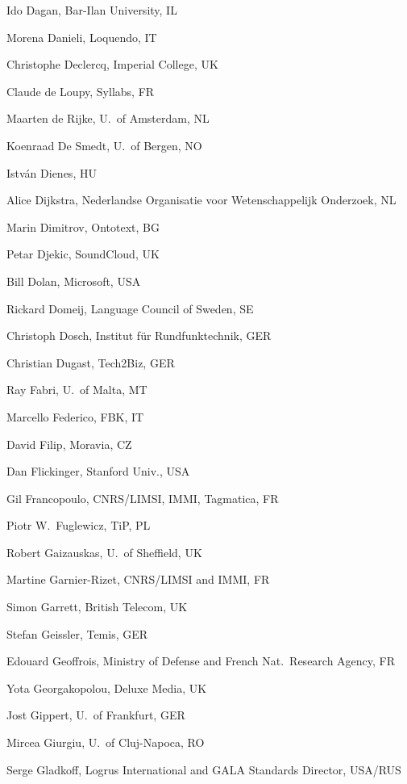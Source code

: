 \documentclass[10pt, plain]{../../metanetpaper}
\begin{document}
\begin{multicols}{3}
\begin{footnotesize}
\begin{enumerate}
{      \item Ido Dagan, Bar-Ilan University, IL
      \item Morena Danieli, Loquendo, IT
      \item Christophe Declercq, Imperial College, UK
      \item Claude de Loupy, Syllabs, FR
      \item Maarten de Rijke, U.~of Amsterdam, NL
      \item Koenraad De Smedt, U.~of Bergen, NO
      \item István Dienes, HU
      \item Alice Dijkstra, Nederlandse Organisatie voor Wetenschappelijk Onderzoek, NL
      \item Marin Dimitrov, Ontotext, BG
      \item Petar Djekic, SoundCloud, UK
      \item Bill Dolan, Microsoft, USA
      \item Rickard Domeij, Language Council of Sweden, SE
      \item Christoph Dosch, Institut für Rundfunktechnik, GER
      \item Christian Dugast, Tech2Biz, GER
      \item Ray Fabri, U.~of Malta, MT
      \item Marcello Federico, FBK, IT
      \item David Filip, Moravia, CZ
      \item Dan Flickinger, Stanford Univ., USA
      \item Gil Francopoulo, CNRS/LIMSI, IMMI, Tagmatica, FR
      \item Piotr W.~Fuglewicz, TiP, PL
      \item Robert Gaizauskas, U.~of Sheffield, UK
      \item Martine Garnier-Rizet, CNRS/LIMSI and IMMI, FR
      \item Simon Garrett, British Telecom, UK
      \item Stefan Geissler, Temis, GER
      \item Edouard Geoffrois, Ministry of Defense and French Nat.~Research Agency, FR
      \item Yota Georgakopolou, Deluxe Media, UK
      \item Jost Gippert, U.~of Frankfurt, GER
      \item Mircea Giurgiu, U.~of Cluj-Napoca, RO
      \item Serge Gladkoff, Logrus International and GALA Standards Director, USA/RUS
}
\end{enumerate}
\end{footnotesize}
\end{multicols}
\end{document}
